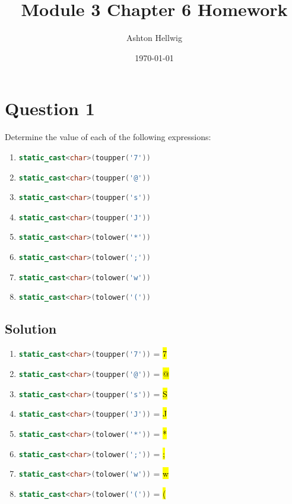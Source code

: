 \documentclass[a4paper, 10pt]{article}
\title{Module 3 Chapter 6 Homework}
\author{Ashton Hellwig}
\date\today
\begin{document}
  \maketitle
  \tableofcontents
  \lstlistoflistings
  \newpage

  \section{Question 1}
    Determine the value of each of the following expressions:
      \begin{enumerate}[label=\Alph*.]
        \item \lstinline[columns=fixed, language=c++]%
          {static_cast<char>(toupper('7'))}
        \item \lstinline[columns=fixed, language=c++]%
          {static_cast<char>(toupper('@'))}
        \item \lstinline[columns=fixed, language=c++]%
          {static_cast<char>(toupper('s'))}
        \item \lstinline[columns=fixed, language=c++]%
          {static_cast<char>(toupper('J'))}
        \item \lstinline[columns=fixed, language=c++]%
          {static_cast<char>(tolower('*'))}
        \item \lstinline[columns=fixed, language=c++]%
          {static_cast<char>(tolower(';'))}
        \item \lstinline[columns=fixed, language=c++]%
          {static_cast<char>(tolower('w'))}
        \item \lstinline[columns=fixed, language=c++]%
          {static_cast<char>(tolower('('))}
      \end{enumerate}
    \subsection{Solution}
      \begin{enumerate}[label=\Alph*.]
        \item \lstinline[columns=fixed, language=c++]%
          {static_cast<char>(toupper('7'))} = \hl{7}
        \item \lstinline[columns=fixed, language=c++]%
          {static_cast<char>(toupper('@'))} = \hl{@}
        \item \lstinline[columns=fixed, language=c++]%
          {static_cast<char>(toupper('s'))} = \hl{S}
        \item \lstinline[columns=fixed, language=c++]%
          {static_cast<char>(toupper('J'))} = \hl{J}
        \item \lstinline[columns=fixed, language=c++]%
          {static_cast<char>(tolower('*'))} = \hl{*}
        \item \lstinline[columns=fixed, language=c++]%
          {static_cast<char>(tolower(';'))} = \hl{;}
        \item \lstinline[columns=fixed, language=c++]%
          {static_cast<char>(tolower('w'))} = \hl{w}
        \item \lstinline[columns=fixed, language=c++]%
          {static_cast<char>(tolower('('))} = \hl{(}
      \end{enumerate}
\end{document}
